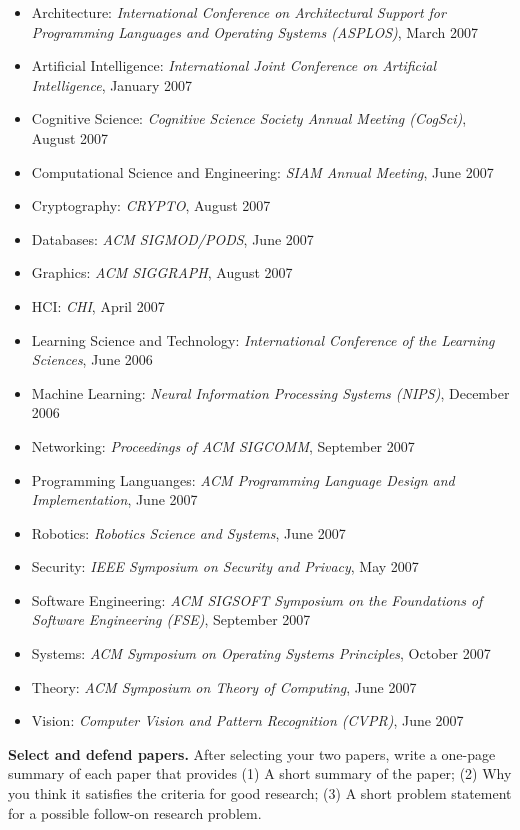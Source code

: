 \documentclass[11pt]{article}
\begin{document}
\begin{itemize}
\itemsep=-1.5pt
\item Architecture: {\em International Conference on
Architectural Support for Programming Languages and Operating Systems
(ASPLOS)}, March 2007
\item Artificial Intelligence: {\em International Joint Conference on
  Artificial Intelligence}, January 2007
\item Cognitive Science: {\em Cognitive Science Society Annual Meeting
  (CogSci)},  August 2007
\item Computational Science and Engineering: {\em SIAM Annual Meeting},
  June 2007
\item Cryptography: {\em CRYPTO}, August 2007
\item Databases: {\em ACM SIGMOD/PODS}, June 2007
\item Graphics: {\em ACM SIGGRAPH}, August 2007
\item HCI: {\em CHI}, April 2007
\item Learning Science and Technology: {\em International Conference of
  the Learning Sciences}, June 2006
\item Machine Learning: {\em Neural Information Processing Systems
  (NIPS)}, December 2006
\item Networking: {\em Proceedings of ACM SIGCOMM}, September 2007
\item Programming Languanges: {\em ACM Programming Language Design and
  Implementation}, June 2007
\item Robotics: {\em Robotics Science and Systems}, June 2007
\item Security: {\em IEEE Symposium on Security and Privacy}, May 2007
\item Software Engineering: {\em ACM SIGSOFT Symposium on the
  Foundations of Software Engineering (FSE)}, September 2007
\item Systems: {\em ACM Symposium on Operating Systems Principles},
  October 2007
\item Theory: {\em ACM Symposium on Theory of Computing}, June 2007
\item Vision: {\em Computer Vision and Pattern Recognition (CVPR)}, June
  2007
\end{itemize}

\noindent
{\bf Select and defend papers.}
After selecting your two papers, write a one-page summary of each paper
that provides (1) A short summary of the paper; (2) Why you think it
satisfies the criteria for good research; (3) A short problem statement
for a possible follow-on research problem.
\end{document}
